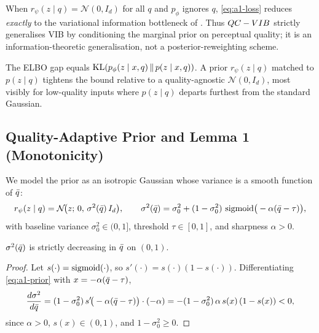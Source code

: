 \begin{remark}\label{rem:a1-vib}
When $r_\psi(z\mid q)=\mathcal{N}(0,I_d)$ for all $q$ and $p_\phi$ ignores $q$, \eqref{eq:a1-loss}
reduces \emph{exactly} to the variational information bottleneck of \citet{alemi2017deep}. Thus
$QC-VIB$ strictly generalises VIB by conditioning the marginal prior on perceptual quality; it is
an information-theoretic generalisation, not a posterior-reweighting scheme.
\end{remark}

\begin{remark}\label{rem:a1-tight}
The ELBO gap equals $\operatorname{KL}(p_\phi(z\mid x,q)\,\|\,p(z\mid x,q))$. A prior $r_\psi(z\mid q)$ matched to
$p(z\mid q)$ tightens the bound relative to a quality-agnostic $\mathcal{N}(0,I_d)$, most visibly for
low-quality inputs where $p(z\mid q)$ departs furthest from the standard Gaussian.
\end{remark}

\subsection{Quality-Adaptive Prior and Lemma 1 (Monotonicity)}\label{app:a1-lemma1}

We model the prior as an isotropic Gaussian whose variance is a smooth function of $\bar{q}$:
\begin{equation}
r_\psi(z\mid q) = \mathcal{N}\!\big(z;\,0,\,\sigma^2(\bar{q})\,I_d\big),\qquad
\sigma^2(\bar{q}) = \sigma_0^2 + (1-\sigma_0^2)\,\operatorname{sigmoid}\!\big(-\alpha(\bar{q}-\tau)\big),
\label{eq:a1-prior}
\end{equation}
with baseline variance $\sigma_0^2\in(0,1]$, threshold $\tau\in[0,1]$, and sharpness $\alpha>0$.

\begin{lemma}\label{lem:mono-full}\label{lem:mono}
$\sigma^2(\bar{q})$ is strictly decreasing in $\bar{q}$ on $(0,1)$.
\end{lemma}

\begin{proof}
Let $s(\cdot)=\operatorname{sigmoid}(\cdot)$, so $s'(\cdot)=s(\cdot)(1-s(\cdot))$. Differentiating
\eqref{eq:a1-prior} with $x=-\alpha(\bar{q}-\tau)$,
\begin{equation}
\frac{d\sigma^2}{d\bar{q}}
= (1-\sigma_0^2)\,s'\!\big(-\alpha(\bar{q}-\tau)\big)\cdot(-\alpha)
= -(1-\sigma_0^2)\,\alpha\,s(x)\,(1-s(x)) < 0,
\label{eq:a1-mono}
\end{equation}
since $\alpha>0$, $s(x)\in(0,1)$, and $1-\sigma_0^2\geq 0$.
\end{proof}

